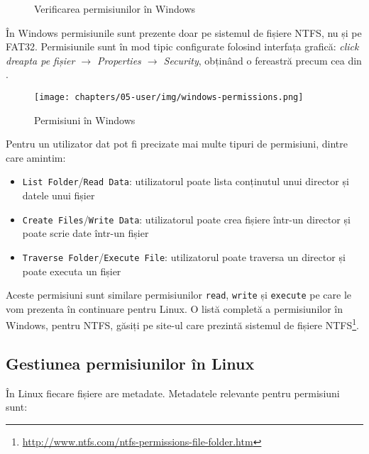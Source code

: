 \begin{figure}[htbp]
  \centering
  \def\svgwidth{0.9\columnwidth}
  
  \caption{Verificarea permisiunilor în Windows}
  \label{fig:user:windows-check-perm}
\end{figure}

În Windows permisiunile sunt prezente doar pe sistemul de fișiere NTFS, nu și pe FAT32.
Permisiunile sunt în mod tipic configurate folosind interfața grafică: \textit{click dreapta pe fișier $\rightarrow$ Properties $\rightarrow$ Security}, obținând o fereastră precum cea din .

\begin{figure}[!htbp]
  \centering
  \texttt{[image: chapters/05-user/img/windows-permissions.png]}
  \caption{Permisiuni în Windows}
  \label{fig:user:windows-permissions}
\end{figure}

Pentru un utilizator dat pot fi precizate mai multe tipuri de permisiuni, dintre care amintim:

\begin{itemize}
  \item \texttt{List Folder}/\texttt{Read Data}: utilizatorul poate lista conținutul unui director și datele unui fișier
  \item \texttt{Create Files}/\texttt{Write Data}: utilizatorul poate crea fișiere într-un director și poate scrie date într-un fișier
  \item \texttt{Traverse Folder}/\texttt{Execute File}: utilizatorul poate traversa un director și poate executa un fișier
\end{itemize}

Aceste permisiuni sunt similare permisiunilor \texttt{read}, \texttt{write} și \texttt{execute} pe care le vom prezenta în continuare pentru Linux.
O listă completă a permisiunilor în Windows, pentru NTFS, găsiți pe site-ul care prezintă sistemul de fișiere NTFS\footnote{\url{http://www.ntfs.com/ntfs-permissions-file-folder.htm}}.

\subsection{Gestiunea permisiunilor în Linux}
\label{sec:user:linux-perm}

În Linux fiecare fișiere are metadate.
Metadatele relevante pentru permisiuni sunt:

